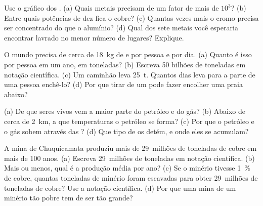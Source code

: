 \begin{exercise}[$\star\star$]\label{exo:g9:earth-resources:7}
Use o gráfico dos . (a) Quais metais precisam de
um fator de mais de $10^3$? (b) Entre quais potências de dez fica o
cobre? (c) Quantas vezes mais o cromo precisa ser concentrado do que o
alumínio? (d) Qual dos sete metais você esperaria encontrar lavrado no
menor número de lugares? Explique.
\end{exercise}

\begin{exercise}[$\star\star$]\label{exo:g9:earth-resources:8}
O mundo precisa de cerca de \qty{18}{kg} de  e  por pessoa e
por dia. (a) Quanto é isso por pessoa em um ano, em toneladas? (b)
Escreva 50 bilhões de toneladas em notação científica. (c) Um caminhão
leva \qty{25}{t}. Quantos dias leva para a parte de uma pessoa enchê-lo?
(d) Por que tirar  de um  pode fazer encolher uma praia 
abaixo?
\end{exercise}

\begin{exercise}[$\star\star$]\label{exo:g9:earth-resources:9}
(a) De que seres vivos vem a maior parte do petróleo e do gás? (b)
Abaixo de cerca de \qty{2}{km}, a que temperaturas o petróleo se forma?
(c) Por que o petróleo e o gás sobem através das ? (d) Que tipo de
 os detém, e onde eles se acumulam?
\end{exercise}

\begin{exercise}[$\star\star$]\label{exo:g9:earth-resources:10}
A mina de Chuquicamata produziu mais de 29~milhões de toneladas de cobre
em mais de 100 anos. (a) Escreva 29~milhões de toneladas em notação
científica. (b) Mais ou menos, qual é a produção média por ano? (c) Se o
minério tivesse \qty{1}{\%} de cobre, quantas toneladas de minério foram
escavadas para obter 29~milhões de toneladas de cobre? Use a notação
científica. (d) Por que uma mina de um minério tão pobre tem de ser tão
grande?
\end{exercise}

